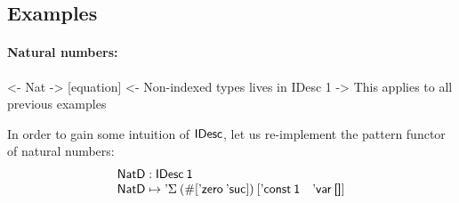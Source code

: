 %
%
%
%


\subsection{Examples}
\label{sec:idesc-examples}

\paragraph{Natural numbers:}

\begin{wstructure}
<- Nat
    -> [equation]
    <- Non-indexed types lives in IDesc 1
        -> This applies to all previous examples
\end{wstructure}

In order to gain some intuition of $\SYMBIDesc$, let us re-implement
the pattern functor of natural numbers:
%
\[\stk{
\NatD : \IDesc{\Unit} \\
\NatD \mapsto \DSigma{(\EnumT{[ \NatZero\: \SYMBNatSuc ]})}
                     {\red{[} \DConst{\Unit} \quad \DVar{\Void} \red{]}}
}\]


